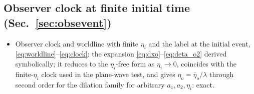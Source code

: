 \subsection*{Observer clock at finite initial time (Sec.~\ref{sec:obsevent})}
\begin{itemize}\itemsep1pt
\item[R-8] Observer clock and worldline with finite $\eta_i$ and the label at the initial event, \eqref{eq:worldline}--\eqref{eq:clock}: the expansion \eqref{eq:dxo}--\eqref{eq:deta_o2} derived symbolically; it reduces to the $\eta_i$-free form as $\eta_i\to0$, coincides with the finite-$\eta_i$ clock used in the plane-wave test, and gives $\eta_o=\bar\eta_o/\lambda$ through second order for the dilation family for arbitrary $a_1,a_2,\eta_i$: exact.
\end{itemize}

